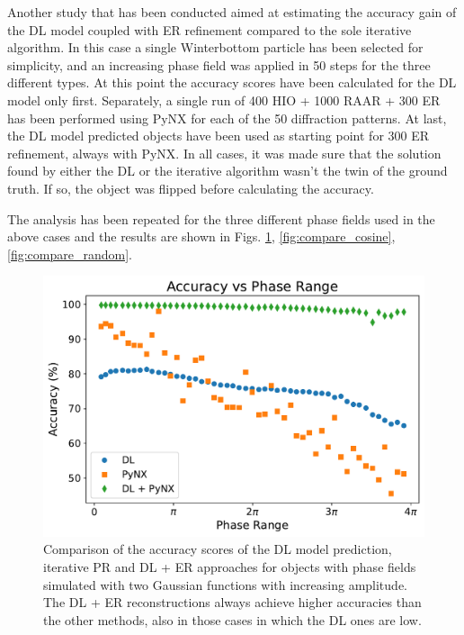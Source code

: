 Another study that has been conducted aimed at estimating the accuracy gain of the DL model coupled with ER refinement 
compared to the sole iterative algorithm. In this case a single Winterbottom particle has been selected for simplicity, 
and an increasing phase field was applied in 50 steps for the three different types. At this point the accuracy scores 
have been calculated for the DL model only first. Separately, a single run of 400 HIO + 1000 RAAR + 300 ER has been 
performed using PyNX for each of the 50 diffraction patterns. At last, the DL model predicted objects have been used
as starting point for 300 ER refinement, always with PyNX. In all cases, it was made sure that the solution found by either 
the DL or the iterative algorithm wasn't the twin of the ground truth. If so, the object was flipped before calculating 
the accuracy. 

The analysis has been repeated for the three different phase fields used in the above cases and the results are 
shown in Figs. \ref{fig:compare_gauss}, \ref{fig:compare_cosine}, \ref{fig:compare_random}. 

\begin{figure}[H]
    \centering
    \includegraphics[width=\textwidth]{figures/Phasing/plot_acc_comparison_gauss_winter.pdf}
    \caption{Comparison of the accuracy scores of the DL model prediction, iterative PR and DL + ER approaches for objects with 
    phase fields simulated with two Gaussian functions with increasing amplitude. The DL + ER reconstructions always achieve 
    higher accuracies than the other methods, also in those cases in which the DL ones are low. }
    \label{fig:compare_gauss}
\end{figure}

